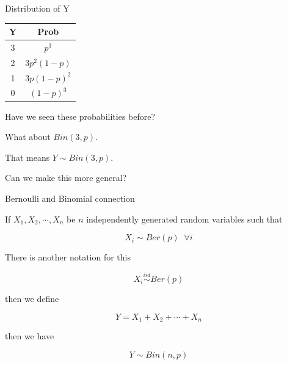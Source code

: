 \documentclass{beamer}\usepackage[]{graphicx}\usepackage[]{color}
\begin{document}
\begin{frame}{Distribution of Y}

\begin{tabular}{|c|c|}
\hline
Y & Prob  \\ \hline
3 & $p^3$ \\ \hline
2 & $3 p^2 (1-p) $ \\ \hline
1 & $3 p (1-p)^2 $\\ \hline
0 & $ (1-p)^3 $\\ \hline
\end{tabular} \pause \newline

Have we seen these probabilities before? \pause \newline

What about $ Bin(3, p) $. \pause \newline

That means $ Y \sim Bin(3, p) $.  \pause \newline

Can we make this more general?

 \end{frame}

\begin{frame}{Bernoulli and Binomial connection}

If $X_1, X_2, \cdots, X_n$ be $n$ independently generated random variables such that 

$$ X_{i} \sim Ber(p) \;\; \forall i $$

There is another notation for this 

$$ X_{i} \stackrel{iid}{\sim} Ber(p) $$

then we define 

$$ Y = X_1 + X_2 + \cdots + X_n $$

then we have 

$$ Y \sim Bin(n,p)  $$

 \end{frame}
\end{document}

